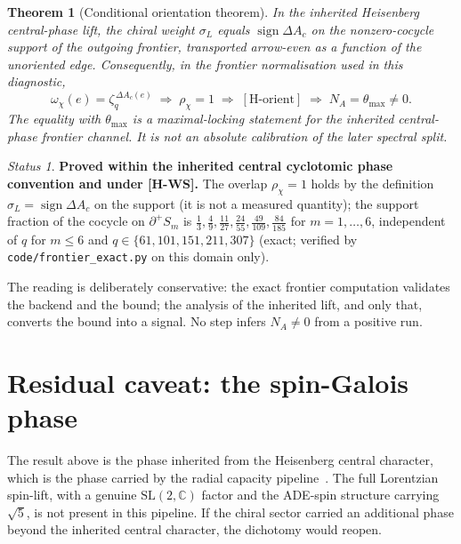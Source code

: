 \documentclass[11pt]{article}
\theoremstyle{plain}
\newtheorem{theorem}{Theorem}
\theoremstyle{remark}
\newtheorem*{status}{Status}
\newcommand{\zq}{\zeta_q}
\newcommand{\dac}{\Delta A_c}
\newcommand{\rhochi}{\rho_\chi}
\newcommand{\thmax}{\theta_{\max}}
\newcommand{\NA}{N_A}
\newcommand{\sgn}{\operatorname{sign}}
\newcommand{\Horient}{[\mathrm{H\text{-}orient}]}
\begin{document}
    \begin{theorem}[Conditional orientation theorem]
In the inherited Heisenberg central-phase lift, the chiral weight $\sigma_L$ equals $\sgn\dac$ on the nonzero-cocycle
support of the outgoing frontier, transported arrow-even as a function of the unoriented edge.
Consequently, in the frontier normalisation used in this diagnostic,
\begin{equation}
  \omega_\chi(e) = \zq^{\,\dac(e)}
  \;\Longrightarrow\;
  \rhochi = 1
  \;\Longrightarrow\;
  \Horient
  \;\Longrightarrow\;
  \NA = \thmax \neq 0.
\end{equation}
The equality with $\thmax$ is a maximal-locking statement for the inherited central-phase frontier channel.
It is not an absolute calibration of the later spectral split.
    \end{theorem}

    \begin{status}\textbf{Proved within the inherited central cyclotomic phase convention and under [H-WS].}
      The overlap $\rhochi=1$ holds by the definition $\sigma_L=\sgn\dac$ on the support (it is not a measured
      quantity); the support fraction of the cocycle on $\partial^+S_m$ is
      $\tfrac13,\tfrac49,\tfrac{11}{27},\tfrac{24}{55},\tfrac{49}{109},\tfrac{84}{185}$ for $m=1,\dots,6$,
      independent of $q$ for $m\le 6$ and $q\in\{61,101,151,211,307\}$ (exact; verified by \texttt{code/frontier\_exact.py} on this domain only).\end{status}

    The reading is deliberately conservative: the exact frontier computation validates the backend and the bound; the analysis of the
    inherited lift, and only that, converts the bound into a signal.
    No step infers $\NA\neq 0$ from a positive run.

  \section{Residual caveat: the spin-Galois phase}

    The result above is the phase inherited from the Heisenberg central character, which is the phase carried by the
    radial capacity pipeline~\cite{Beau2026a16}.
    The full Lorentzian spin-lift, with a genuine $\mathrm{SL}(2,\mathbb{C})$ factor and the ADE-spin structure carrying
    $\sqrt{5}$, is not present in this pipeline.
    If the chiral sector carried an additional phase beyond the inherited central character, the dichotomy would reopen.
\end{document}
